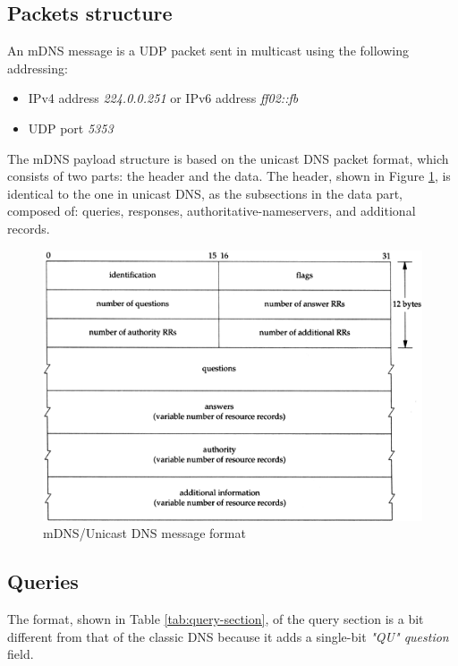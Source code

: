 \documentclass[fleqn, 11pt]{SelfArx} %
\begin{document}
\subsection{Packets structure}
An mDNS message is a UDP packet sent in multicast using the following addressing:
\begin{itemize}[leftmargin=*]
    \item IPv4 address \textit{224.0.0.251} or IPv6 address \textit{ff02::fb}
    \item UDP port \textit{5353}
\end{itemize}
The mDNS payload structure is based on the unicast DNS packet format, which consists of two parts: the header and the data.\newline
The header, shown in Figure \ref{fig:msdns-message-1}, is identical to the one in unicast DNS, as the subsections in the data part, composed of: queries, responses, authoritative-nameservers, and additional records.
\begin{figure}[H]\centering
    \includegraphics[width=\linewidth]{./msg-format.png}
    \caption{mDNS/Unicast DNS message format}
    \label{fig:msdns-message-1}
\end{figure}

\subsection{Queries}
The format, shown in Table \ref{tab:query-section}, of the query section is a bit different from that of the classic DNS because it adds a single-bit {\it{"QU" question}} field. \newline
\end{document}

